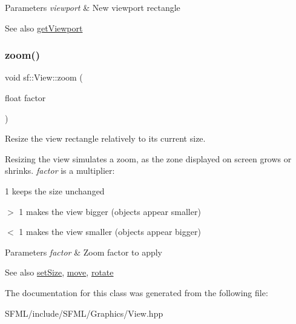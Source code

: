 \begin{DoxyParams}{Parameters}
{\em viewport} & New viewport rectangle\\
\hline
\end{DoxyParams}
\begin{DoxySeeAlso}{See also}
\mbox{\hyperlink{classsf_1_1_view_a93859b4e2e8c191ec741731211a0fb12}{get\+Viewport}} \begin{DoxyVerb}\end{DoxyVerb}
 
\end{DoxySeeAlso}
\mbox{\label{classsf_1_1_view_a4a72a360a5792fbe4e99cd6feaf7726e}} 
\subsubsection{\texorpdfstring{zoom()}{zoom()}}
{\footnotesize\ttfamily void sf\+::\+View\+::zoom (\begin{DoxyParamCaption}\item[{float}]{factor }\end{DoxyParamCaption})}



Resize the view rectangle relatively to its current size. 

Resizing the view simulates a zoom, as the zone displayed on screen grows or shrinks. {\itshape factor} is a multiplier\+: \begin{DoxyItemize}
\item 1 keeps the size unchanged \item $>$ 1 makes the view bigger (objects appear smaller) \item $<$ 1 makes the view smaller (objects appear bigger)\end{DoxyItemize}

\begin{DoxyParams}{Parameters}
{\em factor} & Zoom factor to apply\\
\hline
\end{DoxyParams}
\begin{DoxySeeAlso}{See also}
\mbox{\hyperlink{classsf_1_1_view_a9525b73fe9fbaceb9568faf56b399dab}{set\+Size}}, \mbox{\hyperlink{classsf_1_1_view_a0c82144b837caf812f7cb25a43d80c41}{move}}, \mbox{\hyperlink{classsf_1_1_view_a5fd3901aae1845586ca40add94faa378}{rotate}} \begin{DoxyVerb}\end{DoxyVerb}
 
\end{DoxySeeAlso}


The documentation for this class was generated from the following file\+:\begin{DoxyCompactItemize}
\item 
S\+F\+M\+L/include/\+S\+F\+M\+L/\+Graphics/View.\+hpp\end{DoxyCompactItemize}
